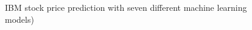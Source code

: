 \documentclass[conference]{IEEEtran}
\begin{document}
\begin{figure}
	\caption{IBM stock price prediction with seven different machine learning models)}
	\label{figure:RMSE_prediction}
\end{figure}
\end{document}
